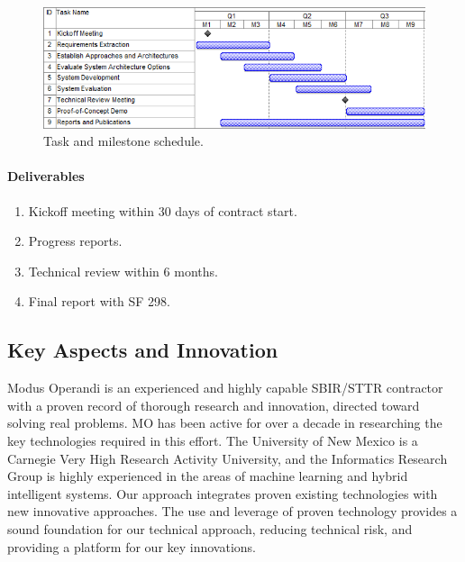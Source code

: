 \documentclass{sbir}
\begin{document}
\begin{figure}[h]
 \centerline{\includegraphics[width=5in]{./images/Gantt.png}}
 \caption{Task and milestone schedule.}
 \label{Gantt}
\end{figure}

\paragraph{Deliverables}
\begin{enumerate}[label=\alph*.] 
\item Kickoff meeting within 30 days of contract start.
\item Progress reports.
\item Technical review within 6 months.
\item Final report with SF 298.
\end{enumerate}


\newpage
\pagestyle{proprietary}

\subsection{Key Aspects and Innovation}
Modus Operandi is an experienced and highly capable SBIR/STTR contractor with a proven record of thorough research and innovation, directed toward solving real problems. MO has been active for over a decade in researching the key technologies required in this effort. The University of New Mexico is a Carnegie Very High Research Activity University, and the Informatics Research Group is highly experienced in the areas of machine learning and hybrid intelligent systems. Our approach integrates proven existing technologies with new innovative approaches. The use and leverage of proven technology provides a sound foundation for our technical approach, reducing technical risk, and providing a platform for our key innovations.
\end{document}
